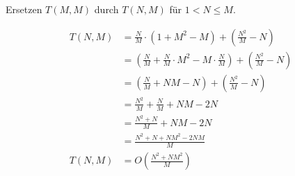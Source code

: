 \documentclass[parskip=half,a4paper]{scrartcl}
\begin{document}
\begin{center}
Ersetzen $T(M,M)$ durch $T(N,M)$ für $1 < N \le M$.
\end{center}

\begin{equation}
\begin{aligned}
    T(N, M) & =  \frac{N}{M} \cdot \left(1 + M^2 - M\right) + \left(\frac{N^2}{M} - N\right) \\
    & =  \left(\frac{N}{M} + \frac{N}{M} \cdot M^2 - M \cdot \frac{N}{M}\right) + \left(\frac{N^2}{M} - N\right) \\
    & =  \left(\frac{N}{M} + NM - N\right) + \left(\frac{N^2}{M} - N\right) \\
    & =  \frac{N^2}{M} + \frac{N}{M} + NM - 2N \\
    & =  \frac{N^2 + N}{M} + NM - 2N \\
    & =  \frac{N^2 + N + NM^2 - 2NM}{M} \\
    T(N, M) & =  O(\frac{N^2 + NM^2}{M}) \\
\end{aligned}
\end{equation}
\end{document}
